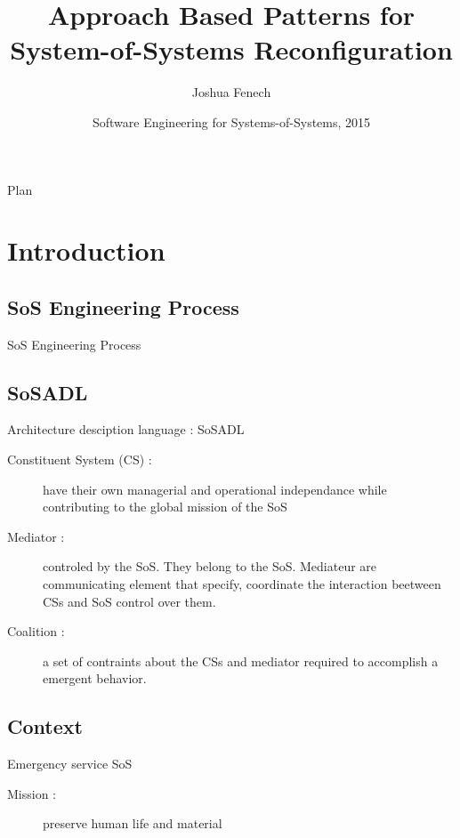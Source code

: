 \documentclass{beamer}
\title[Patterns for SoS Reconfiguration] 
{Approach Based Patterns for System-of-Systems Reconfiguration}
\author[Joshua Fenech] 
{Joshua Fenech}
\institute[]
{
	MLDM\\
	Universit\'e de Jean Monnet\\
	Saint-\'Etienne, France
}
\date[SESOS 2015] 
{Software Engineering for Systems-of-Systems, 2015}
\begin{document}
\begin{frame}
  \titlepage
\end{frame}

\begin{frame}{Plan}
  \tableofcontents
\end{frame}

\section{Introduction}

\subsection{SoS Engineering Process}
\begin{frame}{SoS Engineering Process}
  
\end{frame}

\subsection{SoSADL}
\begin{frame}{Architecture desciption language : SoSADL}
\begin{description}
  \item[Constituent System (CS) :] have their own managerial and
    operational independance while contributing to the global mission
    of the SoS
  \item[Mediator :] controled by the SoS. They belong to the
    SoS. Mediateur are communicating element that specify, coordinate
    the interaction beetween CSs and SoS control over them.
  \item[Coalition :] a set of contraints about the CSs and
    mediator required to accomplish a emergent behavior.
\end{description}
\end{frame}

\subsection{Context}
\begin{frame}{Emergency service SoS}
\begin{description}
  \item[Mission :] preserve human life and material
\end{description}

\end{frame}
\end{document}
